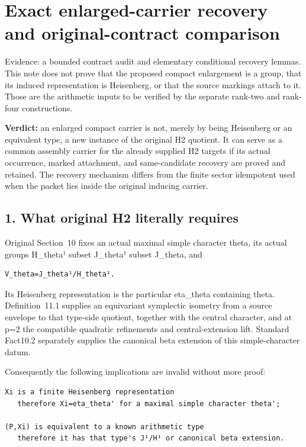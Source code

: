 \clearpage
\section{Exact enlarged-carrier recovery and original-contract comparison}\label{app:lowrank_contract}

Evidence: a bounded contract audit and elementary conditional recovery
lemmas. This note does not prove that the proposed compact enlargement
is a group, that its induced representation is Heisenberg, or that the
source markings attach to it. Those are the arithmetic inputs to be
verified by the separate rank-two and rank-four constructions.

\textbf{Verdict:} an enlarged compact carrier is not, merely by being
Heisenberg or an equivalent type, a new instance of the original H2
quotient. It can serve as a common assembly carrier for the already
supplied H2 targets if its actual occurrence, marked attachment, and
same-candidate recovery are proved and retained. The recovery mechanism
differs from the finite sector idempotent used when the packet lies
inside the original inducing carrier.

\hypertarget{lowrank_contract-what-original-h2-literally-requires}{%
\subsection{1. What original H2 literally
requires}\label{lowrank_contract-what-original-h2-literally-requires}}

Original Section~10 fixes an actual maximal simple character theta, its
actual groups H\_theta¹ subset J\_theta¹ subset J\_theta, and

\begin{Verbatim}[fontsize=\small,breaklines=true,breakanywhere=true]
V_theta=J_theta¹/H_theta¹.
\end{Verbatim}

Its Heisenberg representation is the particular eta\_theta containing
theta. Definition~11.1 supplies an equivariant symplectic isometry from a
source envelope to that type-side quotient, together with the central
character, and at p=2 the compatible quadratic refinements and
central-extension lift. Standard Fact10.2 separately supplies the
canonical beta extension of this simple-character datum.

Consequently the following implications are invalid without more proof:

\begin{Verbatim}[fontsize=\small,breaklines=true,breakanywhere=true]
Xi is a finite Heisenberg representation
   therefore Xi=eta_theta' for a maximal simple character theta';

(P,Xi) is equivalent to a known arithmetic type
   therefore it has that type's J¹/H¹ or canonical beta extension.
\end{Verbatim}

